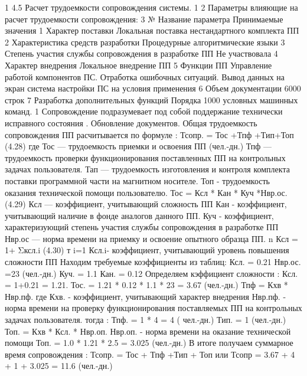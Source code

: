 \begin{ESKDexplanation}
\begin{ESKDexplanation}
\begin{ESKDexplanation}
\begin{ESKDexplanation}
	1	4.5      Расчет трудоемкости сопровождения системы.
	1	
	2	Параметры влияющие на расчет трудоемкости сопровождения:
	3	
№
Название параметра
Принимаемые значения
1
Характер поставки
Локальная поставка нестандартного комплекта ПП
2
Характеристика средств разработки
Процедурные алгоритмические языки
3
Степень участия службы сопровождения в разработке ПП
Не участвовала
4
Характер внедрения
Локальное внедрение ПП
5
Функции ПП
Управление работой компонентов ПС. Отработка ошибочных ситуаций. Вывод данных на экран система настройки ПС на условия применения
6
Объем документации
6000 строк
7
Разработка дополнительных функций
Порядка 1000 условных машинных команд.
	1	
Сопровождение подразумевает под собой поддержание технически исправного состояния . Обновление документов.
Общая трудоемкость сопровождения ПП расчитывается по формуле :
Тсопр. = Тос +Тпф +Тип+Топ                                                                                                           (4.28)
 где Тос — трудоемкость приемки и освоения ПП (чел.-дн.)
Тпф — трудоемкость проверки функционирования поставленных ПП
 на контрольных задачах пользователя.
Тап ---  трудоемкость изготовления и контроля комплекта поставки 
 программной части на магнитном носителе.   
Топ -      трудоемкость оказания технической помощи пользователю. 
Тос = Ксл * Кан * Куч *Нвр.ос.                                                                          (4.29)
Ксл — коэффициент, учитывающий сложность ПП       
Кан -    коэффициент, учитывающий наличие в фонде аналогов данного ПП.
Куч -     коэффициент, характеризующий степень участия службы 
сопровождения в разработке ПП 
Нвр.ос — норма времени на приемку и освоение опытного образца ПП.
                            n
          Ксл = 1+ Σксл.i                                                                                                                       (4.30)
                          т  i=1
Ксл.i-  коэффициент,  учитывающий уровень повышения сложности ПП
Находим требуемые коэффициенты из таблиц:
Ксл. = 0.21
Нвр.ос. =23 (чел.-дн.)
Куч. = 1.1
Кан. = 0.12
Определяем кэффициент сложности :
Ксл. = 1+0.21 = 1.21.
Тос. =  1.21 * 0.12 * 1.1 * 23 = 3.67 (чел.-дн.)
Тпф = Кхв * Нвр.пф.
где Кхв. - коэффициент, учитывающий характер внедрения 
Нвр.пф. - норма времени на проверку функционирования 
поставляемых ПП на контрольных задачах пользователя.
тогда :
Тпф. = 1 * 4 = 4 ( чел.-дн.)
Тип. = 1 (чел.-дн.)
Топ. = Кхв * Ксл. * Нвр.оп.
Нвр.оп. - норма времени на оказание технической помощи 
Топ. = 1.0 * 1.21 * 2.5 =   3.025 (чел.-дн.)
В итоге получаем суммарное время сопровождения :
Тсопр. = Тос + Тпф +Тип + Топ    или
Тсопр = 3.67 + 4 + 1 + 3.025 =  11.6 (чел.-дн.)


\end{ESKDexplanation}
\end{ESKDexplanation}
\end{ESKDexplanation}
\end{ESKDexplanation}
